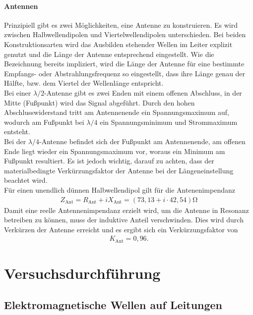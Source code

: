 \documentclass[a4paper,twoside,final]{article}
\begin{document}
\paragraph{Antennen}
Prinzipiell gibt es zwei Möglichkeiten, eine Antenne zu konstruieren. Es wird zwischen Halbwellendipolen und Viertelwellendipolen unterschieden. Bei beiden Konstruktionsarten wird das Ausbilden stehender Wellen im Leiter explizit genutzt und die Länge der Antenne entsprechend eingestellt. Wie die Bezeichnung bereits impliziert, wird die Länge der Antenne für eine bestimmte Empfangs- oder Abstrahlungsfrequenz so eingestellt, dass ihre Länge genau der Hälfte, bzw. dem Viertel der Wellenlänge entspricht.\\
Bei einer $\lambda/2$-Antenne gibt es zwei Enden mit einem offenen Abschluss, in der Mitte (Fußpunkt) wird das Signal abgeführt. Durch den hohen Abschlusswiderstand tritt am Antennenende ein Spannungsmaximum auf, wodurch am Fußpunkt bei $\lambda/4$ ein Spannungsminimum und Strommaximum entsteht.\\
Bei der $\lambda/4$-Antenne befindet sich der Fußpunkt am Antennenende, am offenen Ende liegt wieder ein Spannungsmaximum vor, woraus ein Minimum am Fußpunkt resultiert. Es ist jedoch wichtig, darauf zu achten, dass der materialbedingte Verkürzungsfaktor der Antenne bei der Längeneinstellung beachtet wird.\\
Für einen unendlich dünnen Halbwellendipol gilt für die Antenenimpendanz
\begin{align}
  Z_\text{Ant} = R_\text{Ant} + i X_\text{Ant} = (73,13 + i\cdot 42,54)\si{\ohm}
\end{align}
Damit eine reelle Antennenimpendanz erzielt wird, um die Antenne in Resonanz betreiben zu können, muss der induktive Anteil verschwinden. Dies wird durch Verkürzen der Antenne erreicht und es ergibt sich ein Verkürzungsfaktor von
\begin{align}
  K_\text{Ant} = 0,96.
\end{align}
\section{Versuchsdurchführung} \label{sec:Versuchsdurchführung}
\subsection{Elektromagnetische Wellen auf Leitungen}
\end{document}
